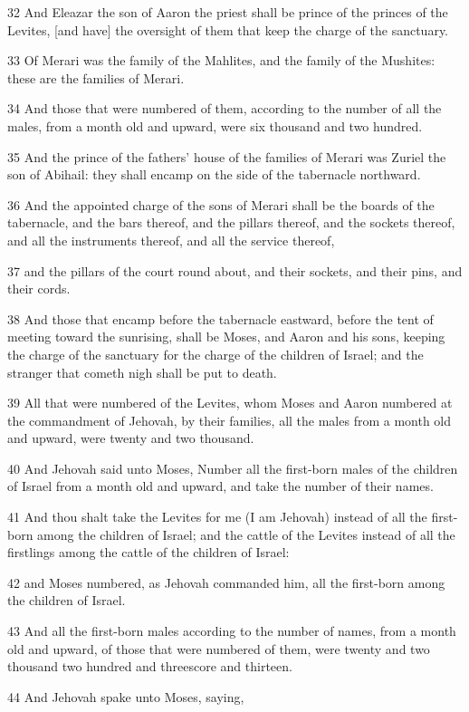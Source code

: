 \par 32 And Eleazar the son of Aaron the priest shall be prince of the princes of the Levites, [and have] the oversight of them that keep the charge of the sanctuary.
\par 33 Of Merari was the family of the Mahlites, and the family of the Mushites: these are the families of Merari.
\par 34 And those that were numbered of them, according to the number of all the males, from a month old and upward, were six thousand and two hundred.
\par 35 And the prince of the fathers' house of the families of Merari was Zuriel the son of Abihail: they shall encamp on the side of the tabernacle northward.
\par 36 And the appointed charge of the sons of Merari shall be the boards of the tabernacle, and the bars thereof, and the pillars thereof, and the sockets thereof, and all the instruments thereof, and all the service thereof,
\par 37 and the pillars of the court round about, and their sockets, and their pins, and their cords.
\par 38 And those that encamp before the tabernacle eastward, before the tent of meeting toward the sunrising, shall be Moses, and Aaron and his sons, keeping the charge of the sanctuary for the charge of the children of Israel; and the stranger that cometh nigh shall be put to death.
\par 39 All that were numbered of the Levites, whom Moses and Aaron numbered at the commandment of Jehovah, by their families, all the males from a month old and upward, were twenty and two thousand.
\par 40 And Jehovah said unto Moses, Number all the first-born males of the children of Israel from a month old and upward, and take the number of their names.
\par 41 And thou shalt take the Levites for me (I am Jehovah) instead of all the first-born among the children of Israel; and the cattle of the Levites instead of all the firstlings among the cattle of the children of Israel:
\par 42 and Moses numbered, as Jehovah commanded him, all the first-born among the children of Israel.
\par 43 And all the first-born males according to the number of names, from a month old and upward, of those that were numbered of them, were twenty and two thousand two hundred and threescore and thirteen.
\par 44 And Jehovah spake unto Moses, saying,
